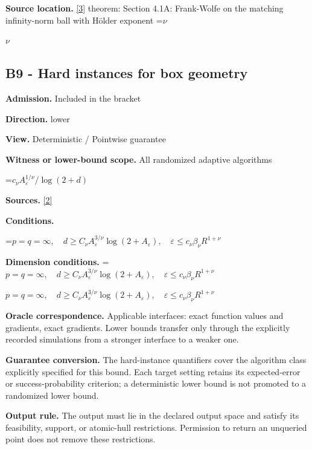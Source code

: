 \documentclass[10pt,a4paper]{article}
\newcommand{\AtlasMath}[1]{\par\begingroup\centering\setbox0=\hbox{$\displaystyle #1$}\ifdim\wd0>1.4\linewidth\typeout{ATLAS WIDE FORMULA: \the\wd0}\fi\ifdim\wd0>\linewidth\resizebox{\linewidth}{!}{\box0}\else\box0\fi\par\endgroup}
\newcommand{\AtlasInlineMath}[1]{\begingroup\setbox0=\hbox{$#1$}\ifdim\wd0>.4\linewidth\endgroup\AtlasMath{#1}\else\endgroup$#1$\fi}
\begin{document}
\textbf{Source location.} \href{https://arxiv.org/pdf/1307.5001}{[3]} theorem: Section 4.1A: Frank-Wolfe on the matching infinity-norm ball with Hölder exponent \AtlasInlineMath{\nu}



\subsection{B9 - Hard instances for box geometry}


\textbf{Admission.} Included in the bracket



\textbf{Direction.} lower



\textbf{View.} Deterministic / Pointwise guarantee



\textbf{Witness or lower-bound scope.} All randomized adaptive algorithms



\AtlasMath{c_\nu A_\varepsilon^{1/\nu}/\log(2+d)}


\textbf{Sources.} \href{https://proceedings.mlr.press/v99/diakonikolas19c/diakonikolas19c.pdf}{[2]}



\textbf{Conditions.}
\AtlasMath{p=q=\infty,\quad d\ge C_\nu A_\varepsilon^{3/\nu}\log(2+A_\varepsilon),\quad\varepsilon\le c_\nu\beta_\nu R^{1+\nu}}




\textbf{Dimension conditions.} \AtlasInlineMath{p=q=\infty,\quad d\ge C_\nu A_\varepsilon^{3/\nu}\log(2+A_\varepsilon),\quad\varepsilon\le c_\nu\beta_\nu R^{1+\nu}}



\textbf{Oracle correspondence.} Applicable interfaces: exact function values and gradients, exact gradients. Lower bounds transfer only through the explicitly recorded simulations from a stronger interface to a weaker one.



\textbf{Guarantee conversion.} The hard-instance quantifiers cover the algorithm class explicitly specified for this bound. Each target setting retains its expected-error or success-probability criterion; a deterministic lower bound is not promoted to a randomized lower bound.



\textbf{Output rule.} The output must lie in the declared output space and satisfy its feasibility, support, or atomic-hull restrictions. Permission to return an unqueried point does not remove these restrictions.
\end{document}
